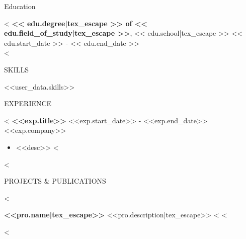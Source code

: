 \documentclass{resume_faangpath_simple_template} %
\begin{document}

\begin{rSection}{Education}

<%
{\bf << edu.degree|tex_escape >> of << edu.field_of_study|tex_escape >>}, << edu.school|tex_escape >> \hfill {<< edu.start_date >> - << edu.end_date >>}\\
<%



\end{rSection}

\begin{rSection}{SKILLS}

<<user_data.skills>>

\end{rSection}


\begin{rSection}{EXPERIENCE}

<%
\textbf{<<exp.title>>} \hfill <<exp.start_date>> - <<exp.end_date>>\\
<<exp.company>>
 \begin{itemize}
     <%
     \item <<desc>>
     <%
 \end{itemize}
<%

\end{rSection}


\begin{rSection}{PROJECTS \& PUBLICATIONS}

\vspace{-1.25em}

<%
\item \textbf{<<pro.name|tex_escape>>} {<<pro.description|tex_escape>>}
<%
    \href{<<pro.link|tex_escape>>}{}
<%


<%

\end{rSection}
\end{document}
